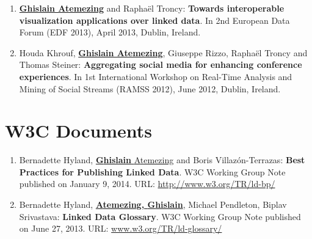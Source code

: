 \begin{enumerate}
 \item \underline{\textbf{Ghislain Atemezing}} and Rapha{\"e}l Troncy: \textbf{Towards interoperable visualization applications over linked data}. In 2nd European Data Forum (EDF 2013), April 2013, Dublin, Ireland.

 \item Houda Khrouf, \underline{\textbf{Ghislain Atemezing}}, Giuseppe Rizzo, Rapha\"{e}l Troncy and Thomas Steiner: \textbf{Aggregating social media for enhancing conference experiences}. In 1st International Workshop on Real-Time Analysis and Mining of Social Streams (RAMSS 2012), June 2012, Dublin, Ireland.
\end{enumerate}

\section*{W3C Documents}
\label{sec:w3cdocs}
\begin{enumerate}
 \item {B}ernadette {H}yland, \underline{\textbf{{G}hislain} {A}temezing} and {B}oris {V}illaz{\'o}n-{T}errazas: \textbf{Best Practices for Publishing Linked Data}. W3C Working Group Note published on January 9, 2014. URL: \url{http://www.w3.org/TR/ld-bp/}

 \item {B}ernadette {H}yland, \underline{\textbf{{A}temezing, {G}hislain}}, {M}ichael {P}endleton, {B}iplav {S}rivastava: \textbf{Linked Data Glossary}. W3C Working Group Note published on June 27, 2013. URL: \url{www.w3.org/TR/ld-glossary/}
\end{enumerate} 
